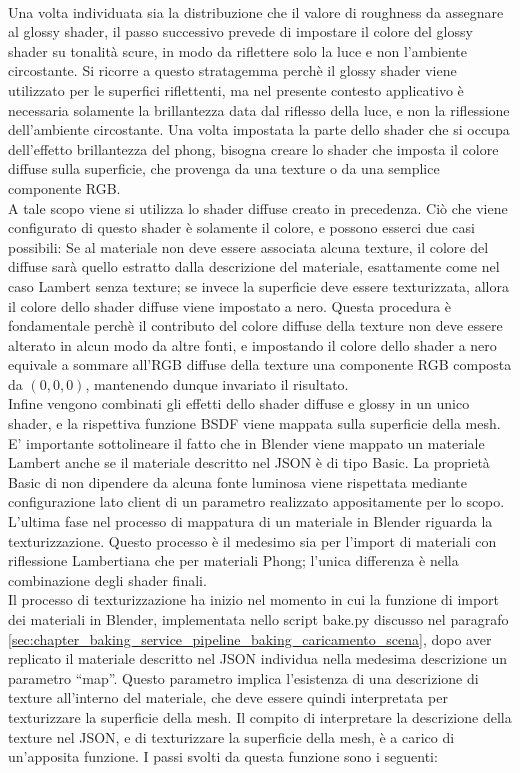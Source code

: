 \\
Una volta individuata sia la distribuzione che il valore di roughness da assegnare al glossy shader, il passo successivo prevede di impostare il colore del glossy shader su tonalità scure, in modo da riflettere solo la luce e non l’ambiente circostante.
Si ricorre a questo stratagemma perchè il glossy shader viene utilizzato per le superfici riflettenti, ma nel presente contesto applicativo è necessaria solamente la brillantezza data dal riflesso della luce, e non la riflessione dell’ambiente circostante. 
Una volta impostata la parte dello shader che si occupa dell’effetto brillantezza del phong, bisogna creare lo shader che imposta il colore diffuse sulla superficie, che provenga da una texture o da una semplice componente RGB.
\\
A tale scopo viene si utilizza lo shader diffuse creato in precedenza. Ciò che viene configurato di questo shader è solamente il colore, e possono esserci due casi possibili:
Se al materiale non deve essere associata alcuna texture, il colore del diffuse sarà quello estratto dalla descrizione del materiale, esattamente come nel caso Lambert senza texture; se invece la superficie deve essere texturizzata, allora il colore dello shader diffuse viene impostato a nero. Questa procedura è fondamentale perchè il contributo del colore diffuse della texture non deve essere alterato in alcun modo da altre fonti, e impostando il colore dello shader a nero equivale a sommare all’RGB diffuse della texture una componente RGB composta da $(0,0,0)$, mantenendo dunque invariato il risultato. 
\\
Infine vengono combinati gli effetti dello shader diffuse e glossy in un unico shader, e la rispettiva funzione BSDF viene mappata sulla superficie della mesh. 
E’ importante sottolineare il fatto che in Blender viene mappato un materiale Lambert anche se il materiale descritto nel JSON è di tipo Basic. La proprietà Basic di non dipendere da alcuna fonte luminosa viene rispettata mediante configurazione lato client di un parametro realizzato appositamente per lo scopo.
\\
L’ultima fase nel processo di mappatura di un materiale in Blender riguarda la texturizzazione.
Questo processo è il medesimo sia per l’import di materiali con riflessione Lambertiana che per materiali Phong; l’unica differenza è nella combinazione degli shader finali. 
\\
Il processo di texturizzazione ha inizio nel momento in cui la funzione di import dei materiali in Blender, implementata nello script bake.py discusso nel paragrafo \ref{sec:chapter_baking_service_pipeline_baking_caricamento_scena}, dopo aver replicato il materiale descritto nel JSON individua nella medesima descrizione un parametro “map”. Questo parametro implica l’esistenza di una descrizione di texture all’interno del materiale, che deve essere quindi interpretata per texturizzare la superficie della mesh. Il compito di interpretare la descrizione della texture nel JSON, e di texturizzare la superficie della mesh, è a carico di un’apposita funzione. I passi svolti da questa funzione sono i seguenti: 

